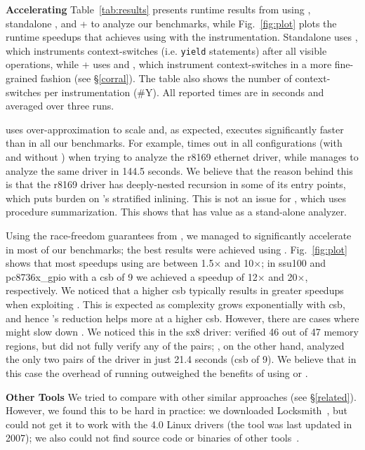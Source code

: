 \noindent\textbf{Accelerating \corral }
%
Table~\ref{tab:results} presents runtime results from using \whoop, standalone \corral, and \whoop + \corral to analyze our benchmarks, while Fig.~\ref{fig:plot} plots the runtime speedups that \corral achieves using \whoop with the \yieldmr instrumentation. Standalone \corral uses \yieldall, which instruments context-switches (i.e. \texttt{yield} statements) after all visible operations, while \whoop + \corral uses \yieldcoarse and \yieldmr, which instrument context-switches in a more fine-grained fashion (see \S\ref{corral}). The table also shows the number of context-switches per instrumentation (\#Y). All reported times are in seconds and averaged over three runs.

\whoop uses over-approximation to scale and, as expected, executes significantly faster than \corral in all our benchmarks. For example, \corral times out in all configurations (with and without \whoop) when trying to analyze the r8169 ethernet driver, while \whoop manages to analyze the same driver in 144.5 seconds. We believe that the reason behind this is that the r8169 driver has deeply-nested recursion in some of its entry points, which puts burden on \corral's stratified inlining. This is not an issue for \whoop, which uses procedure summarization. This shows that \whoop has value as a stand-alone analyzer.

Using the race-freedom guarantees from \whoop, we managed to significantly accelerate \corral in most of our benchmarks; the best results were achieved using \yieldmr. Fig.~\ref{fig:plot} shows that most speedups using \yieldmr are between 1.5$\times$ and 10$\times$; in ssu100 and pc8736x\_gpio with a csb of 9 we achieved a speedup of 12$\times$ and 20$\times$, respectively. We noticed that a higher csb typically results in greater speedups when exploiting \whoop. This is expected as complexity grows exponentially with csb, and hence \whoop's reduction helps more at a higher csb.
%
However, there are cases where \whoop might slow down \corral. We noticed this in the sx8 driver: \whoop verified 46 out of 47 memory regions, but did not fully verify any of the pairs; \corral, on the other hand, analyzed the only two pairs of the driver in just 21.4 seconds (csb of 9). We believe that in this case the overhead of running \whoop outweighed the benefits of using \yieldcoarse or \yieldmr.

\noindent\textbf{Other Tools }
%
We tried to compare \whoop with other similar approaches (see \S\ref{related}). However, we found this to be hard in practice: we downloaded Locksmith~\cite{pratikakis2006locksmith}, but could not get it to work with the 4.0 Linux drivers (the tool was last updated in 2007); we also could not find source code or binaries of other tools~\cite{kahlon2007fast, kahlon2009semantic, das2015section}.

